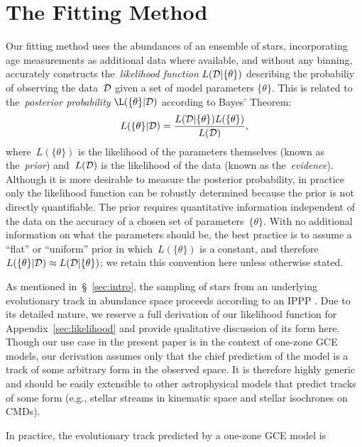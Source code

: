 \documentclass[ms.tex]{subfiles}
\begin{document}
\section{The Fitting Method}
\label{sec:fitting}

Our fitting method uses the abundances of an ensemble of stars, incorporating
age measurements as additional data where available, and without any binning,
accurately constructs the~\textit{likelihood function}
$L(\mathcal{D} | \{\theta\})$ describing the probabiliy of observing the
data~$\mathcal{D}$ given a set of model parameters $\{\theta\}$.
This is related to the~\textit{posterior probability}
$\L(\{\theta\} | \script{D})$ according to Bayes' Theorem:
\begin{equation}
L(\{\theta\} | \mathcal{D}) = \frac{
	L(\mathcal{D} | \{\theta\}) L(\{\theta\})
}{
	L(\mathcal{D})
},
\label{eq:bayes}
\end{equation}
where~$L(\{\theta\})$ is the likelihood of the parameters themselves (known as
the~\textit{prior}) and~$L(\mathcal{D})$ is the likelihood of the data (known as
the~\textit{evidence}).
Although it is more desirable to measure the posterior probability, in practice
only the likelihood function can be robustly determined because the prior is
not directly quantifiable.
The prior requires quantitative information independent of the data on the
accuracy of a chosen set of parameters~$\{\theta\}$.
With no additional information on what the parameters should be, the best
practice is to assume a ``flat'' or ``uniform'' prior in which~$L(\{\theta\})$
is a constant, and therefore~$L(\{\theta\} | \mathcal{D}) \approx
L(\mathcal{D} | \{\theta\})$; we retain this convention here unless otherwise
stated.
\par
As mentioned in~\S~\ref{sec:intro}, the sampling of stars from an underlying
evolutionary track in abundance space proceeds according to an IPPP
\citep[e.g.,][]{Press2007}.
Due to its detailed nature, we reserve a full derivation of our likelihood
function for Appendix~\ref{sec:likelihood} and provide qualitative discussion
of its form here.
Though our use case in the present paper is in the context of one-zone GCE
models, our derivation assumes only that the chief prediction of the model is
a track of some arbitrary form in the observed space.
It is therefore highly generic and should be easily extensible to other
astrophysical models that predict tracks of some form (e.g., stellar streams
in kinematic space and stellar isochrones on CMDs).
\par
In practice, the evolutionary track predicted by a one-zone GCE model is
\end{document}
